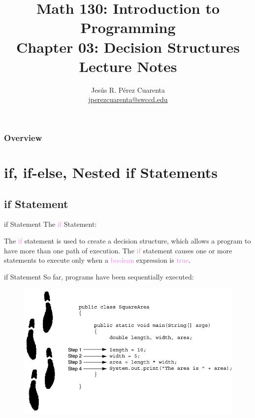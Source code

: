 \documentclass[11pt]{beamer}
\title[Chapter 03 Notes]{Math 130: Introduction to Programming \\ Chapter 03: Decision Structures \\ Lecture Notes}
\author{Jesús R. Pérez Cuarenta \\
\href{mailto:jperezcuarenta@swccd.edu}{jperezcuarenta@swccd.edu}
}
\date{} %
\newcommand{\violet}[1]{\textcolor{violet}{#1}}
\begin{document}
% 
% 
\section{}

\begin{frame}
  \maketitle
\end{frame}

\begin{frame}
\frametitle{Overview}
    \begin{multicols}{2}
    \tableofcontents
    \end{multicols}
\end{frame}

\section{if, if-else, Nested if Statements}
\subsection{if Statement}
\begin{frame}{if Statement}
    The \violet{if} Statement:
        \begin{center}
        The \violet{if} statement is used to create a decision structure, which allows a program to have more than one path of execution. The \violet{if} statement causes one or more statements to execute only when a \violet{boolean} expression is \violet{true}.
        \end{center}
\end{frame}

\begin{frame}{if Statement}
    So far, programs have been sequentially executed:
        \noindent 
        \begin{figure}[H]
        \centering
        \includegraphics[scale=0.35]{Images/chapter03_sequentialCode.png}
        \end{figure}
\end{frame}
\end{document}
